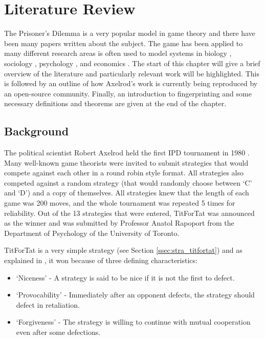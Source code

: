 
\chapter{Literature Review}\label{cha:literature_review}

The Prisoner's Dilemma is a very popular model in game theory and there have been many papers written about the subject.
The game has been applied to many different research areas is often used to model systems in biology \cite{Sigmund1999}, sociology \cite{Franken2005}, psychology \cite{Ishibuchi2005}, and economics \cite{Chong2005}.
The start of this chapter will give a brief overview of the literature and particularly relevant work will be highlighted.
This is followed by an outline of how Axelrod's work is currently being reproduced by an open-source community.
Finally, an introduction to fingerprinting and some necessary definitions and theorems are given at the end of the chapter.


\section{Background}\label{sec:axelrodoriginal}

The political scientist Robert Axelrod held the first IPD tournament in 1980 \cite{Axelrod1980a}.
Many well-known game theorists were invited to submit strategies that would compete against each other in a round robin style format.
All strategies also competed against a random strategy (that would randomly choose between `C' and `D') and a copy of themselves.
All strategies knew that the length of each game was 200 moves, and the whole tournament was repeated 5 times for reliability.
Out of the 13 strategies that were entered, TitForTat was announced as the winner and was submitted by Professor Anatol Rapoport from the Department of Psychology of the University of Toronto.

TitForTat is a very simple strategy (see Section \ref{ssec:stra_titfortat}) and as explained in \cite{Axelrod1980b}, it won because of three defining characteristics:

\begin{itemize}
    \item `Niceness' - A strategy is said to be nice if it is not the first to defect.
    \item `Provocability' - Immediately after an opponent defects, the strategy should defect in retaliation.
    \item `Forgiveness' - The strategy is willing to continue with mutual cooperation even after some defections.
\end{itemize}

